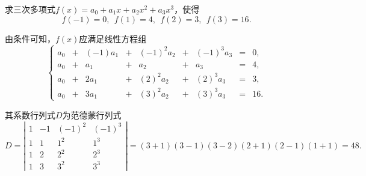 \begin{li}
  求三次多项式$f(x)=a_0+a_1x+a_2x^2+a_3x^3$，使得
  $$
  f(-1)=0,~~f(1)=4,~~f(2)=3,~~f(3)=16.
  $$
\end{li}

\begin{jie}
由条件可知，$f(x)$应满足线性方程组
$$
\left\{
  \begin{array}{rcrcrcrcrcr}
    a_0&+&(-1)a_1&+&(-1)^2a_2&+&(-1)^3a_3&=&0, \\[0.2cm]
    a_0&+&    a_1&+&      a_2&+&      a_3&=&4, \\[0.2cm]
    a_0&+&  2 a_1&+&( 2)^2a_2&+&( 2)^3a_3&=&3, \\[0.2cm]
    a_0&+&  3 a_1&+&( 3)^2a_2&+&( 3)^3a_3&=&16.
  \end{array}
\right.
$$

其系数行列式$D$为范德蒙行列式
$$
D = \left|
  \begin{array}{cccc}
    1& -1&(-1)^2&(-1)^3\\[0.1cm]
    1&  1&   1^2&1^3\\[0.1cm]
    1&  2&   2^2&2^3\\[0.1cm]
    1&  3&   3^2&3^3
  \end{array}
\right| 
= (3+1)(3-1)(3-2)(2+1)(2-1)(1+1) = 48.
$$






\end{jie}
